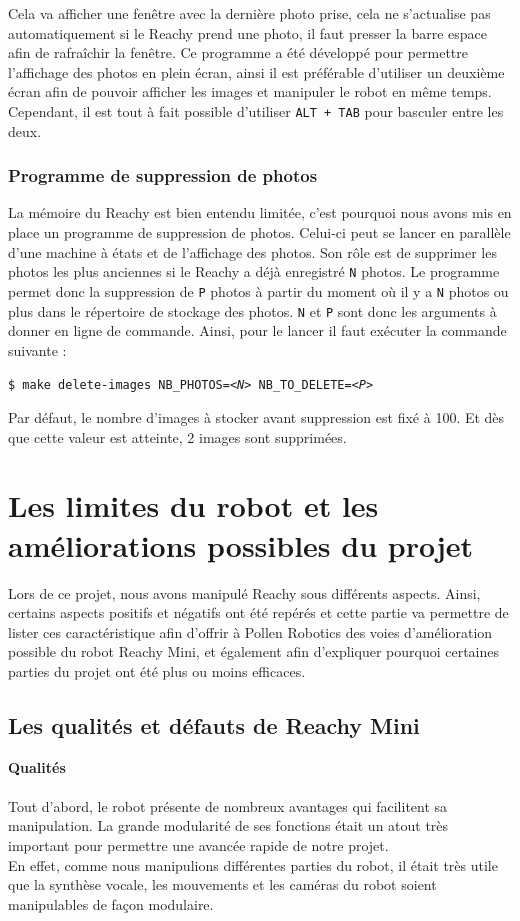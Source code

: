 \documentclass[a4paper,french]{article}
\begin{document}
Cela va afficher une fenêtre avec la dernière photo prise, cela ne s'actualise pas automatiquement si le Reachy prend une photo, il faut presser la barre espace afin de rafraîchir la fenêtre. Ce programme a été développé pour permettre l'affichage des photos en plein écran, ainsi il est préférable d'utiliser un deuxième écran afin de pouvoir afficher les images et manipuler le robot en même temps. Cependant, il est tout à fait possible d'utiliser \texttt{ALT + TAB} pour basculer entre les deux.

\subsubsection{Programme de suppression de photos}
La mémoire du Reachy est bien entendu limitée, c'est pourquoi nous avons mis en place un programme de suppression de photos. Celui-ci peut se lancer en parallèle d'une machine à états et de l'affichage des photos. Son rôle est de supprimer les photos les plus anciennes si le Reachy a déjà enregistré \texttt{N} photos. Le programme permet donc la suppression de \texttt{P} photos à partir du moment où il y a \texttt{N} photos ou plus dans le répertoire de stockage des photos. \texttt{N} et \texttt{P} sont donc les arguments à donner en ligne de commande. Ainsi, pour le lancer il faut exécuter la commande suivante :
\begin{center}
    \texttt{\$ make delete-images NB\_PHOTOS=\textit{<N>} NB\_TO\_DELETE=\textit{<P>}}
\end{center}

Par défaut, le nombre d'images à stocker avant suppression est fixé à 100. Et dès que cette valeur est atteinte, 2 images sont supprimées.


\section{Les limites du robot et les améliorations possibles du projet}
Lors de ce projet, nous avons manipulé Reachy sous différents aspects. Ainsi, certains aspects positifs et négatifs ont été repérés et cette partie va permettre de lister ces caractéristique afin d'offrir à Pollen Robotics des voies d'amélioration possible du robot Reachy Mini, et également afin d'expliquer pourquoi certaines parties du projet ont été plus ou moins efficaces.

\subsection{Les qualités et défauts de Reachy Mini}
\textbf{Qualités}\\\\
Tout d'abord, le robot présente de nombreux avantages qui facilitent sa manipulation. La grande modularité de ses fonctions était un atout très important pour permettre une avancée rapide de notre projet. \\
En effet, comme nous manipulions différentes parties du robot, il était très utile que la synthèse vocale, les mouvements et les caméras du robot soient manipulables de façon modulaire. \\
\end{document}
